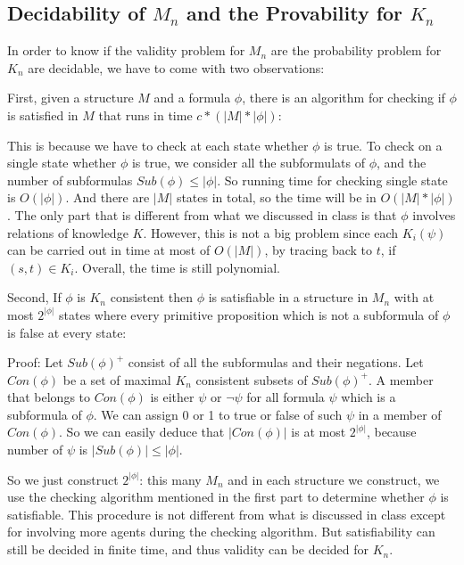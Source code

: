 \documentclass{article}
\begin{document}
\subsection{Decidability of $M_n$ and the Provability for $K_n$}
\par In order to know if the validity problem for $M_n$ are the probability problem for $K_n$ are decidable, we have to come with two observations: \\
\par First, given a structure $M$ and a formula $\phi$, there is an algorithm for checking if $\phi$ is satisfied in $M$ that runs in time $c*(|M|*|\phi|)$:
\par This is because we have to check at each state whether $\phi$ is true. To check on a single state whether $\phi$ is true, we consider all the subformulats of $\phi$, and the number of subformulas $Sub(\phi) \leq |\phi|$. So running time for checking single state is $O(|\phi|)$. And there are $|M|$ states in total, so the time will be in $O(|M|*|\phi|)$. The only part that is different from what we discussed in class is that $\phi$ involves relations of knowledge $K$. However, this is not a big problem since each $K_i(\psi)$ can be carried out in time at most of $O(|M|)$, by tracing back to $t$, if $(s,t)\in K_i$. Overall, the time is still polynomial. \\
\par Second, If $\phi$ is $K_n$ consistent then $\phi$ is satisfiable in a structure in $M_n$ with at most $2^{|\phi|}$ states where every primitive proposition which is not a subformula of $\phi$ is false at every state:
\par Proof: Let $Sub(\phi)^+$ consist of all the subformulas and their negations. Let $Con(\phi)$ be a set of maximal $K_n$ consistent subsets of $Sub(\phi)^+$. A member that belongs to $Con(\phi)$ is either $\psi$ or $\lnot\psi$ for all formula $\psi$ which is a subformula of $\phi$. We can assign 0 or 1 to true or false of such $\psi$ in a member of $Con(\phi)$. So we can easily deduce that $|Con(\phi)|$ is at most $2^{|\phi|}$, because number of $\psi$ is $|Sub(\phi)|\leq |\phi|$. \\ 
\par So we just construct $2^{|\phi|}$: this many $M_n$ and in each structure we construct, we use the checking algorithm mentioned in the first part to determine whether $\phi$ is satisfiable. This procedure is not different from what is discussed in class except for involving more agents during the checking algorithm. But satisfiability can still be decided in finite time, and thus validity can be decided for $K_n$.
\end{document}
